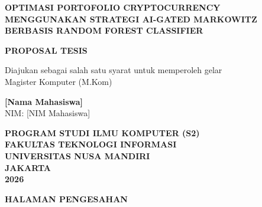 \documentclass[12pt,a4paper]{article}
\begin{document}
\begin{titlepage}
    \centering
    
    {\Large \textbf{OPTIMASI PORTOFOLIO CRYPTOCURRENCY MENGGUNAKAN STRATEGI AI-GATED MARKOWITZ BERBASIS RANDOM FOREST CLASSIFIER}\par}
    
    \vspace{2cm}
    
    
    \vspace{1cm}
    
    {\Large \textbf{PROPOSAL TESIS}\par}
    
    \vspace{1cm}
    
    {\normalsize Diajukan sebagai salah satu syarat untuk memperoleh gelar\\
    Magister Komputer (M.Kom)\par}
    
    \vspace{2cm}
    
    {\normalsize
    \textbf{[Nama Mahasiswa]}\\
    NIM: [NIM Mahasiswa]\par}
    
    \vspace{2cm}
    
    {\normalsize
    \textbf{PROGRAM STUDI ILMU KOMPUTER (S2)}\\
    \textbf{FAKULTAS TEKNOLOGI INFORMASI}\\
    \textbf{UNIVERSITAS NUSA MANDIRI}\\
    \textbf{JAKARTA}\\
    \textbf{2026}\par}
    
\end{titlepage}

\newpage
\thispagestyle{empty}

\begin{center}
    {\Large \textbf{HALAMAN PENGESAHAN}\par}
\end{center}
\end{document}
